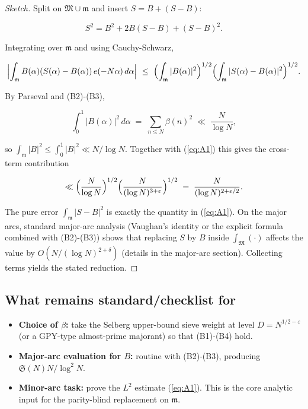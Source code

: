 \documentclass[11pt]{article}
\def\eqref#1{(\ref{#1})}%
\theoremstyle{definition}
\theoremstyle{remark}
\numberwithin{equation}{part}
\begin{document}
\begin{proof}[Sketch]
	Split on $\mathfrak M\cup\mathfrak m$ and insert $S=B+(S-B)$:

	$$
		S^2 = B^2 + 2B(S-B) + (S-B)^2.
	$$

	Integrating over $\mathfrak m$ and using Cauchy-Schwarz,

	$$
		\Bigl|\int_{\mathfrak m} B(\alpha)(S(\alpha)-B(\alpha))\,e(-N\alpha)\,d\alpha\Bigr|
		\ \le\ \Bigl(\int_{\mathfrak m}|B(\alpha)|^2\Bigr)^{1/2}
		\Bigl(\int_{\mathfrak m}|S(\alpha)-B(\alpha)|^2\Bigr)^{1/2}.
	$$

	By Parseval and (B2)-(B3),

	$$
		\int_0^1 |B(\alpha)|^2\,d\alpha \;=\; \sum_{n\le N}\beta(n)^2 \;\ll\; \frac{N}{\log N},
	$$

	so $\int_{\mathfrak m}|B|^2\le\int_0^1|B|^2\ll N/\log N$. Together with \eqref{eq:A1} this gives the cross-term contribution

	$$
		\ll \Bigl(\frac{N}{\log N}\Bigr)^{1/2}\Bigl(\frac{N}{(\log N)^{3+\varepsilon}}\Bigr)^{1/2}
		\;=\;\frac{N}{(\log N)^{2+\varepsilon/2}}.
	$$

	The pure error $\int_{\mathfrak m}|S-B|^2$ is exactly the quantity in \eqref{eq:A1}. On the major arcs, standard major-arc analysis (Vaughan's identity or the explicit formula combined with (B2)-(B3)) shows that replacing $S$ by $B$ inside $\int_{\mathfrak M}(\cdot)$ affects the value by $O(N/(\log N)^{2+\delta})$ (details in the major-arc section). Collecting terms yields the stated reduction.
\end{proof}

\subsection{What remains standard/checklist for \textbeta}

\begin{itemize}
	\item \textbf{Choice of $\beta$:} take the Selberg upper-bound sieve weight at level $D=N^{1/2-\varepsilon}$ (or a GPY-type almost-prime majorant) so that (B1)-(B4) hold.
	\item \textbf{Major-arc evaluation for $B$:} routine with (B2)-(B3), producing $\mathfrak S(N)N/\log^2 N$.
	\item \textbf{Minor-arc task:} prove the $L^2$ estimate \eqref{eq:A1}. This is the core analytic input for the parity-blind replacement on $\mathfrak m$.
\end{itemize}
\end{document}
